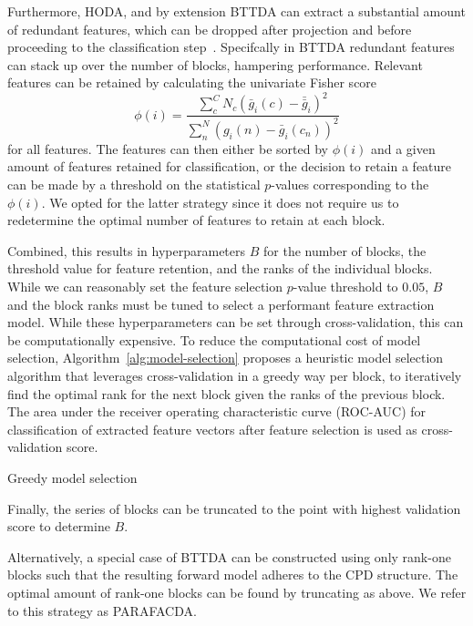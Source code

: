 \documentclass[twocolumn]{article}
\begin{document}
Furthermore, \textsc{HODA}, and by extension \textsc{BTTDA} can extract a substantial amount
of redundant features, which can be dropped after projection and before proceeding to the classification
step~\cite{Phan2010}.
Specifcally in \textsc{BTTDA} redundant features can stack up over the number of
blocks, hampering performance.
Relevant features can be retained by calculating the
univariate Fisher score
\begin{equation}
	\phi(i) = \frac
	{\sum_c^C N_c \left(\bar{g}_i(c)-\bar{\bar{g}}_i\right)^2}
	{\sum_n^N \left(g_i(n)-\bar{g}_i(c_n)\right)^2}
\end{equation}
for all features.
The features can then either be sorted by $\phi(i)$ and a given amount of
features retained for classification, or the decision to retain a feature can
be made by a threshold on the statistical $p$-values corresponding to the
$\phi(i)$.
We opted for the latter strategy since it does not require us to redetermine the
optimal number of features to retain at each block.

Combined, this results in hyperparameters $B$ for the number of blocks, the
threshold value for feature retention, and the ranks of the individual blocks.
While we can reasonably set the feature selection $p$-value threshold to $0.05$,
$B$ and the block ranks must be tuned to select a performant feature extraction
model.
While these hyperparameters can be set through cross-validation, this can be
computationally expensive.
To reduce the computational cost of model selection,
Algorithm~\ref{alg:model-selection} proposes a heuristic model selection
algorithm that leverages cross-validation in a greedy way per block, to
iteratively find the optimal rank for the next block given the ranks of the
previous block.
The area under the receiver operating characteristic curve (ROC-AUC) for
classification of extracted feature vectors after feature selection is used as
cross-validation score.
\begin{algorithm}
	\caption{Greedy model selection}
	\label{alg:model-selection}
	
\end{algorithm}
Finally, the series of blocks can be truncated to the point with
highest validation score to determine $B$.

Alternatively, a special case of BTTDA can be constructed using only rank-one
blocks such that the resulting forward model adheres to the CPD structure.
The optimal amount of rank-one blocks can be found by truncating as above.
We refer to this strategy as PARAFACDA.
\end{document}
